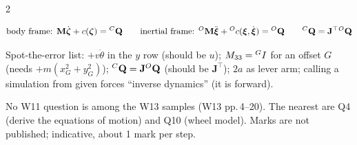 \begin{multicols}{2}
\begin{fbx}
\[\text{body frame: }\mathbf M\dot{\boldsymbol\zeta}+c(\boldsymbol\zeta)={}^{C}\mathbf Q\qquad\text{inertial frame: }{}^O\mathbf M\ddot{\boldsymbol\xi}+{}^Oc(\boldsymbol\xi,\dot{\boldsymbol\xi})={}^{O}\mathbf Q\qquad{}^{C}\mathbf Q=\mathbf J^\top{}^{O}\mathbf Q\]
\end{fbx}
\begin{trap}
Spot-the-error list: $+v\dot\theta$ in the $y$ row (should be $u$); $M_{33}={}^{G}I$ for an offset $G$ (needs $+m(x_G^2+y_G^2)$); ${}^{C}\mathbf Q=\mathbf J{}^{O}\mathbf Q$ (should be $\mathbf J^\top$); $2a$ as lever arm; calling a simulation from given forces ``inverse dynamics'' (it is forward).
\end{trap}

No W11 question is among the W13 samples (W13 pp.\,4--20). The nearest are Q4 (derive the equations of motion) and Q10 (wheel model). Marks are not published; indicative, about 1 mark per step.


\end{multicols}
